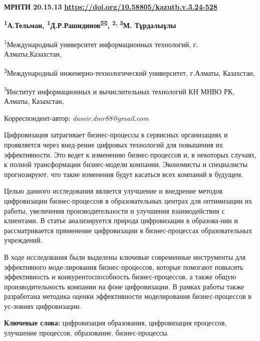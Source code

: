 \newpage
{\bfseries МРНТИ 20.15.13}
\hfill {\bfseries \href{https://doi.org/10.58805/kazutb.v.3.24-528}{https://doi.org/10.58805/kazutb.v.3.24-528}}


\begin{center}


{\bfseries \textsuperscript{1}А.Тельман, \textsuperscript{1}Д.Р.Рашидинов\textsuperscript{🖂}, \textsuperscript{2, 3}М. Тұрдалыұлы}

\textsuperscript{1}Международный университет информационных технологий, г. Алматы,Казахстан,

\textsuperscript{2}Международный инженерно-технологический университет, г.Алматы, Казахстан,

\textsuperscript{3}Институт информационных и вычислительных технологий КН МНВО РК, Алматы, Казахстан,
\end{center}
Корреспондент-автор: \emph{damir.dmr88@gmail.com}\vspace{0.5cm}

Цифровизация затрагивает бизнес-процессы в сервисных организациях и
проявляется через внед-рение цифровых технологий для повышения их
эффективности. Это ведет к изменению бизнес-процессов и, в некоторых
случаях, к полной трансформации бизнес-модели компании. Экономисты и
специалисты прогнозируют, что такие изменения будут касаться всех
компаний в будущем.

Целью данного исследования является улучшение и внедрение методов
цифровизации бизнес-процессов в образовательных центрах для оптимизации
их работы, увеличения производительности и улучшения взаимодействия с
клиентами. В статье анализируется природа цифровизации в образова-нии и
рассматривается применение цифровизации в бизнес-процессах
образовательных учреждений.

В ходе исследования были выделены ключевые современные инструменты для
эффективного моде-лирования бизнес-процессов, которые помогают повысить
эффективность и конкурентоспособность бизнес-процессов, а также общую
производительность компании на фоне цифровизации. В рамках работы также
разработана методика оценки эффективности моделирования бизнес-процессов
в ус-ловиях цифровизации.

{\bfseries Ключевые слова:} цифровизация образования, цифровизация
процессов, улучшение процессов, образование, бизнес-процессы.

